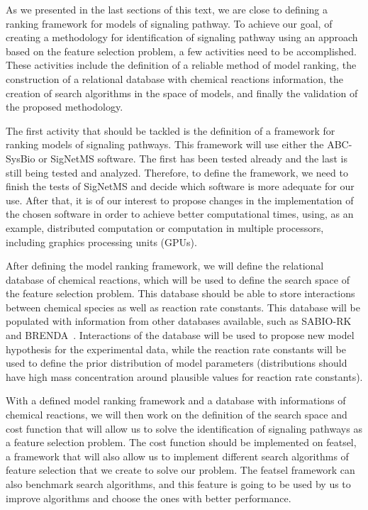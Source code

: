 As we presented in the last sections of this text, we are close to
defining a ranking framework for models of signaling pathway. To achieve
our goal, of creating a methodology for identification of signaling 
pathway using an approach based on the feature selection problem, a few
activities need to be accomplished. These activities include the
definition of a reliable method of model ranking, the construction of
a relational database with chemical reactions information, the creation
of search algorithms in the space of models, and finally the validation
of the proposed methodology.

The first activity that should be tackled is the definition of a 
framework for ranking models of signaling pathways. This framework will
use either the ABC-SysBio or SigNetMS software. The first has been 
tested already and the last is still being tested and analyzed. 
Therefore, to define the framework, we need to finish the tests of 
SigNetMS and decide which software is more adequate for our use. After
that, it is of our interest to propose changes in the implementation of 
the chosen software in order to achieve better computational times, 
using, as an example, distributed computation or computation in multiple 
processors, including graphics processing units (GPUs).

After defining the model ranking framework, we will define the 
relational database of chemical reactions, which will be used to define 
the search space of the feature selection problem. This database should
be able to store interactions between chemical species as well as 
reaction rate constants.  This database will be populated with 
information from other databases available, such as 
SABIO-RK~\cite{Wittig2011} and BRENDA~\cite{Schomburg2004}. Interactions 
of the database will be used to propose new model hypothesis for the 
experimental data, while the reaction rate constants will be used to 
define the prior distribution of model parameters (distributions should 
have high mass concentration around plausible values for reaction rate 
constants).

With a defined model ranking framework and a database with informations
of chemical reactions, we will then work on the definition of the
search space and cost function that will allow us to solve the 
identification of signaling pathways as a feature selection problem.
The cost function should be implemented on featsel, a framework that 
will also allow us to implement different search algorithms of 
feature selection that we create to solve our problem. The featsel
framework can also benchmark search algorithms, and this feature is 
going to be used by us to improve algorithms and choose the ones with 
better performance.


